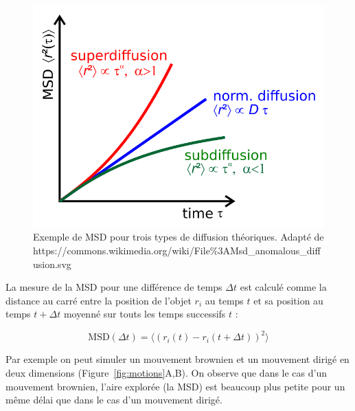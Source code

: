 \documentclass[12pt,a4paper,twoside,openright]{book}
\begin{document}
\begin{figure}[htbp]
\centering
\includegraphics{figures/results/imaging/wiki_diffuse.png}
\caption[Exemple de MSD pour trois types de diffusion théoriques]{\label{fig:wiki_diffuse}Exemple
de MSD pour trois types de diffusion théoriques. Adapté de
https://commons.wikimedia.org/wiki/File\%3AMsd\_anomalous\_diffusion.svg}
\end{figure}

La mesure de la MSD pour une différence de temps \(\Delta t\) est
calculé comme la distance au carré entre la position de l'objet \(r_i\)
au temps \(t\) et sa position au temps \(t+\Delta t\) moyenné sur touts
les temps successifs \(t\) :

\[
\mbox{MSD}(\Delta t) = \langle (r_i(t) - r_i(t + \Delta t)) ^ 2 \rangle
\]

Par exemple on peut simuler un mouvement brownien et un mouvement dirigé
en deux dimensions (Figure~\ref{fig:motions}A,B). On observe que dans le
cas d'un mouvement brownien, l'aire explorée (la MSD) est beaucoup plus
petite pour un même délai que dans le cas d'un mouvement dirigé.
\end{document}
